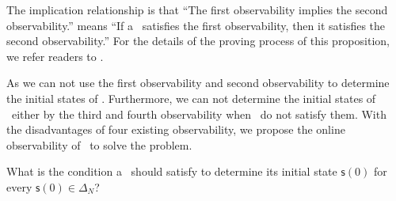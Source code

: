 The implication relationship is that ``The first observability implies the second observability.'' means ``If a \BCN\ satisfies the first observability, then it satisfies the second observability.'' For the details of the proving process of this proposition, we refer readers to \cite{Zhang2016Observability}.
   

 

As we can not use the first observability and second observability to determine the initial states of \BCNs.  Furthermore, we can not determine the initial states of \BCNs\ either by the third and fourth observability when \BCNs\ do not satisfy them. With the disadvantages of four existing observability, we propose the online observability of \BCNs\ to solve the problem.

 \begin{problem}
\label{pro:2}
What is the condition a \BCN\ should satisfy to determine its initial state $\mathsf{s}(0)$ for every $\mathsf{s}(0)\in\Delta_N$?
\end{problem}